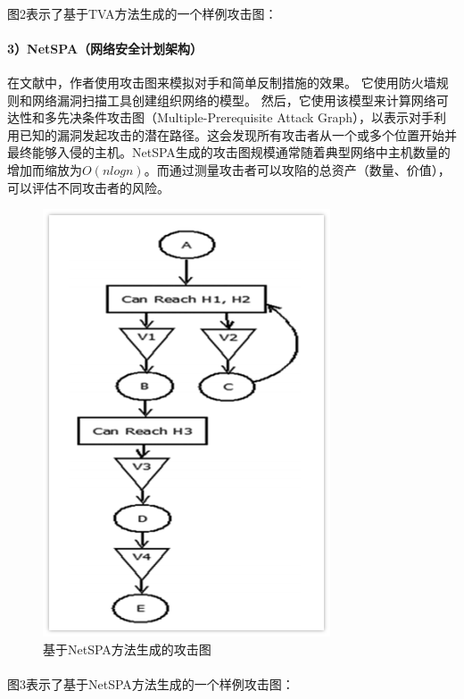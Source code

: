 \documentclass[12pt,a4paper]{article}
\begin{document}
\paragraph{}
图2表示了基于TVA方法生成的一个样例攻击图：
\paragraph{3）NetSPA（网络安全计划架构）}
在文献\cite{6}\cite{7}中，作者使用攻击图来模拟对手和简单反制措施的效果。 它使用防火墙规则和网络漏洞扫描工具创建组织网络的模型。 然后，它使用该模型来计算网络可达性和多先决条件攻击图（Multiple-Prerequisite Attack Graph），以表示对手利用已知的漏洞发起攻击的潜在路径。这会发现所有攻击者从一个或多个位置开始并最终能够入侵的主机。NetSPA生成的攻击图规模通常随着典型网络中主机数量的增加而缩放为$O(nlogn)$。而通过测量攻击者可以攻陷的总资产（数量、价值），可以评估不同攻击者的风险。
\begin{figure}[!htp]
	\centering
	\includegraphics[scale=0.7]{images/NetSPA.png} 
	\caption{基于NetSPA方法生成的攻击图}
\end{figure}
\paragraph{}
图3表示了基于NetSPA方法生成的一个样例攻击图：
\end{document}
